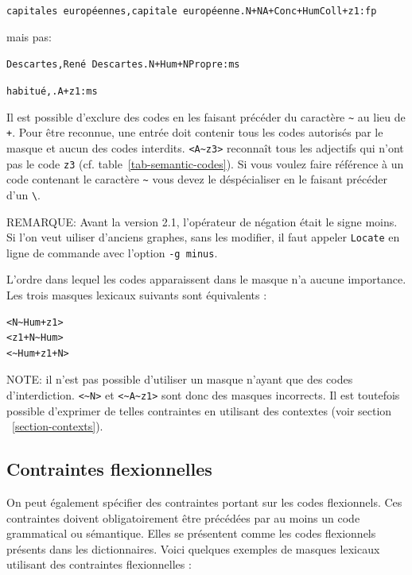 \noindent
\texttt{capitales europ\'eennes,capitale europ\'eenne.N+NA+Conc+HumColl+z1:fp}

\bigskip
\noindent mais pas:

\bigskip
\noindent
\texttt{Descartes,Ren\'e Descartes.N+Hum+NPropre:ms}

\noindent
\texttt{habitu\'e,.A+z1:ms}

\bigskip
\noindent Il est possible d’exclure des codes en les faisant précéder du caractère \verb+~+
au lieu de \verb$+$. Pour être reconnue, une entrée doit contenir tous les codes autorisés par le
masque et aucun des codes interdits. \verb$<A~z3>$ reconnaît tous les adjectifs qui n'ont pas le
code \verb+z3+ (cf. table~\ref{tab-semantic-codes}). Si vous voulez faire référence à un code
contenant le caractère \verb$~$ vous devez le déspécialiser en le faisant précéder d'un \verb+\+.

\bigskip
\noindent REMARQUE: Avant la version 2.1, l'opérateur de négation était le signe moins. Si l'on veut
uiliser d'anciens graphes, sans les modifier, il faut appeler \verb+Locate+ en ligne de commande
avec l'option \verb+-g minus+.
                       
\index{\verb+~+}

\bigskip
\noindent L’ordre dans lequel les codes apparaissent dans le masque n’a aucune importance. Les
trois masques lexicaux suivants sont équivalents :


\begin{verbatim}
<N~Hum+z1>
<z1+N~Hum>
<~Hum+z1+N>
\end{verbatim}

\bigskip
\noindent NOTE: il n’est pas possible d’utiliser un masque n’ayant que des codes d'interdiction.
\verb+<~N>+ et \verb+<~A~z1>+ sont donc des masques incorrects.
Il est toutefois possible d’exprimer de telles contraintes en utilisant des contextes (voir section
~\ref{section-contexts}).



\subsection{Contraintes flexionnelles}
On peut également spécifier des contraintes portant sur les codes flexionnels. Ces contraintes
doivent obligatoirement être précédées par au moins un code grammatical ou sémantique. Elles se
présentent comme les codes flexionnels présents dans les dictionnaires. Voici quelques exemples de
masques lexicaux utilisant des contraintes flexionnelles :

